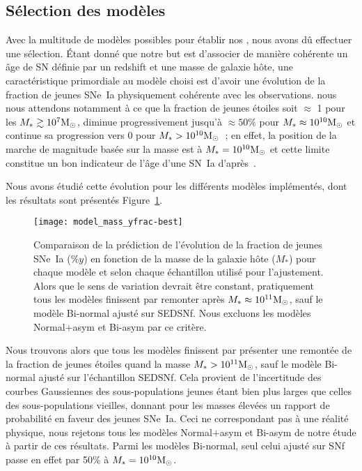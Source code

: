 \documentclass[../main/main.tex]{subfiles}
\begin{document}
\subsection{Sélection des modèles}\label{ssec:mmodsel}

Avec la multitude de modèles possibles pour établir nos \hostlib, nous avons dû
effectuer une sélection. Étant donné que notre but est d'associer de manière
cohérente un âge de SN définie par un redshift et une masse de galaxie hôte, une
caractéristique primordiale au modèle choisi est d'avoir une évolution de la
fraction de jeunes SNe~Ia physiquement cohérente avec les observations. nous
nous attendons notamment à ce que la fraction de jeunes étoiles soit $\approx$ 1
pour les $M_* \gtrsim 10^7\si{\Msun}$, diminue progressivement jusqu'à $\approx
50\%$ pour $M_* \approx 10^{10}\si{\Msun}$ et continue sa progression vers 0
pour $M_* > 10^{10}\si{\Msun}$~; en effet, la position de la marche de magnitude
basée sur la masse est à $M_* = 10^{10}\si{\Msun}$ et cette limite constitue un
bon indicateur de l'âge d'une SN~Ia d'après~\cite{briday2022}.

Nous avons étudié cette évolution pour les différents modèles implémentés, dont
les résultats sont présentés Figure~\ref{fig:ypc}.

\begin{figure}[ht]
    \centerfloat
    \texttt{[image: model\_mass\_yfrac-best]}
    \caption[Comparaison de la prédiction de l'évolution de la fraction de
    jeunes SNe~Ia en fonction de la masse de la galaxie hôte]{Comparaison de la
        prédiction de l'évolution de la fraction de jeunes SNe~Ia ($\%y$) en
        fonction de la masse de la galaxie hôte ($M_*$) pour chaque modèle et
        selon chaque échantillon utilisé pour l'ajustement. Alors que le sens de
        variation devrait être constant, pratiquement tous les modèles finissent
        par remonter après $M_* \approx 10^{11}\si{\Msun}$, sauf le modèle
        Bi-normal ajusté sur SEDSNf. Nous excluons les modèles Normal+asym et
    Bi-asym par ce critère.}
    \label{fig:ypc}
\end{figure}

Nous trouvons alors que tous les modèles finissent par présenter une remontée de
la fraction de jeunes étoiles quand la masse $M_* > 10^{11}\si{\Msun}$, sauf le
modèle Bi-normal ajusté sur l'échantillon SEDSNf. Cela provient de l'incertitude
des courbes Gaussiennes des sous-populations jeunes étant bien plus larges que
celles des sous-populations vieilles, donnant pour les masses élevées un rapport
de probabilité en faveur des jeunes SNe~Ia. Ceci ne correspondant pas à une
réalité physique, nous rejetons tous les modèles Normal+asym et Bi-asym de
notre étude à partir de ces résultats. Parmi les modèles Bi-normal, seul celui
ajusté sur SNf passe en effet par 50\% à $M_*=10^{10}\si{\Msun}$.
\end{document}
